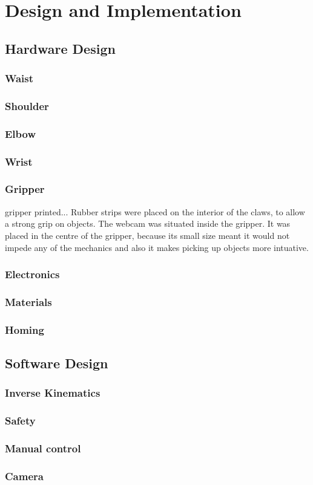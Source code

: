 \section{Design and Implementation}

\subsection{Hardware Design}
\subsubsection{Waist}
\subsubsection{Shoulder}
\subsubsection{Elbow}
\subsubsection{Wrist}
\subsubsection{Gripper}
gripper printed...
\newline
Rubber strips were placed on the interior of the claws, to allow a strong grip on objects.
\newline
The webcam was situated inside the gripper. It was placed in the centre of the gripper, because its small size meant it would not impede any of the mechanics and also it makes picking up objects more intuative.

\subsubsection{Electronics}
\subsubsection{Materials}
\subsubsection{Homing}


\subsection{Software Design}
\subsubsection{Inverse Kinematics}
\subsubsection{Safety}
\subsubsection{Manual control}
\subsubsection{Camera}


